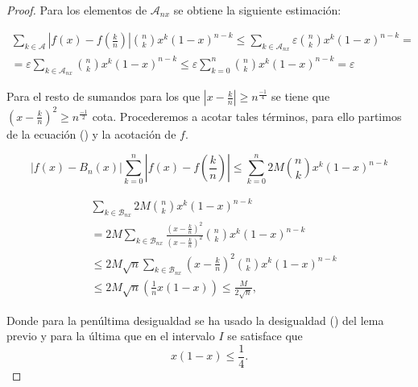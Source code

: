 \begin{proof}
     Para los elementos de $\mathcal{A}_{n x}$ se obtiene la siguiente estimación: 

     \begin{equation*}
        \begin{split}
        \sum_{k \in \mathcal A } \left|f(x) - f \left( \frac{k}{n} \right)\right|
     \binom{n}{k} x^{k} (1-x)^{n-k}
     \leq 
     \sum_{k \in \mathcal{A}_{n x} } \varepsilon \binom{n}{k} x^{k} (1-x)^{n-k} 
     =  \\
      = \varepsilon \sum_{k \in \mathcal{A}_{n x} }  \binom{n}{k} x^{k} (1-x)^{n-k} 
     \leq 
     \varepsilon \sum_{k = 0} ^ n  \binom{n}{k} x^{k} (1-x)^{n-k} = 
     \varepsilon
        \end{split}
    \end{equation*}

    Para el resto de sumandos para los que $|x - \frac{k}{n}| \geq  n^{\frac{-1}{4}}$ se tiene que 
    $(x - \frac{k}{n})^2 \geq  n^{\frac{-1}{2}}$ cota. Procederemos a acotar tales términos, para ello partimos de la ecuación () y  la acotación de $f$. 

    \begin{equation*}
        |f(x)-B_n(x)| \sum_{k=0}^n \left|f(x) - f \left( \frac{k}{n} \right)\right|  
     \leq \sum_{k=0}^n 2M 
    \binom{n}{k} x^{k} (1-x)^{n-k}
    \end{equation*}
    
    \begin{align*}
        & \sum_{k \in \mathcal{B}_{n x}} 2M 
    \binom{n}{k} x^{k} (1-x)^{n-k}
    \\ 
    & 
    = 2M \sum_{k \in \mathcal{B}_{n x}} 
    \frac{
        \left(x- \frac{k}{n}\right)^2
    }{
        \left(x- \frac{k}{n}\right)^2
    }
    \binom{n}{k} x^{k} (1-x)^{n-k}
    \\
    &
    \leq 2M 
    \sqrt{n}
    \sum_{k \in \mathcal{B}_{n x}} 
    \left(x- \frac{k}{n}\right)^2
    \binom{n}{k} x^{k} (1-x)^{n-k}
    \\
    & %
    \leq
    2M \sqrt{n}
    \left(
        \frac{1}{n} x(1-x)
    \right)
    \leq 
    \frac{M}{2 \sqrt{n}},
    \end{align*}

    Donde para la penúltima desigualdad se ha usado 
    la desigualdad () del lema previo y para la última que en el intervalo $I$ se satisface que 
    \begin{equation*}
        x (1-x) \leq \frac{1}{4}.
    \end{equation*}


\end{proof}
